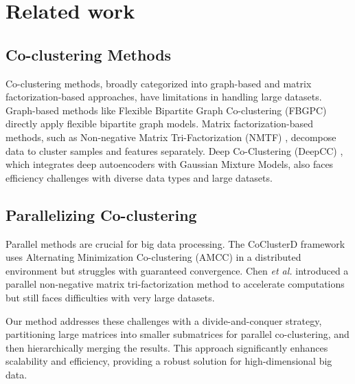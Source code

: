 \documentclass[letterpaper, 10 pt, conference]{ieeeconf}  %
\begin{document}

\section{Related work}
\label{sec:related_work}
\subsection{Co-clustering Methods}
Co-clustering methods, broadly categorized into graph-based and matrix factorization-based approaches, have limitations in handling large datasets. Graph-based methods like Flexible Bipartite Graph Co-clustering (FBGPC) \cite{chen2023FastFlexibleBipartite} directly apply flexible bipartite graph models. Matrix factorization-based methods, such as Non-negative Matrix Tri-Factorization (NMTF) \cite{long2005CoclusteringBlockValue}, decompose data to cluster samples and features separately. Deep Co-Clustering (DeepCC) \cite{dongkuanxu2019DeepCoClustering}, which integrates deep autoencoders with Gaussian Mixture Models, also faces efficiency challenges with diverse data types and large datasets.

\subsection{Parallelizing Co-clustering}
Parallel methods are crucial for big data processing. The CoClusterD framework \cite{cheng2015CoClusterDDistributedFramework} uses Alternating Minimization Co-clustering (AMCC) in a distributed environment but struggles with guaranteed convergence. Chen \textit{et al.} \cite{chen2023ParallelNonNegativeMatrix} introduced a parallel non-negative matrix tri-factorization method to accelerate computations but still faces difficulties with very large datasets.

Our method addresses these challenges with a divide-and-conquer strategy, partitioning large matrices into smaller submatrices for parallel co-clustering, and then hierarchically merging the results. This approach significantly enhances scalability and efficiency, providing a robust solution for high-dimensional big data.
\end{document}

